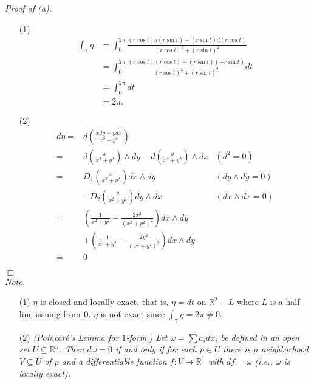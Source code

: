 \documentclass{article}
\begin{document}
\emph{Proof of (a).}
\begin{enumerate}
\item[(1)]
  \begin{align*}
    \int_{\gamma} \eta
    &= \int_{0}^{2\pi}
      \frac{(r\cos t) d(r\sin t) - (r\sin t) d(r\cos t)}{(r\cos t)^2 + (r\sin t)^2} \\
    &= \int_{0}^{2\pi}
      \frac{(r \cos t)(r \cos t) - (r\sin t) (-r\sin t)}{(r\cos t)^2 + (r\sin t)^2} dt \\
    &= \int_{0}^{2\pi} dt \\
    &= 2\pi.
  \end{align*}

\item[(2)]
  \begin{align*}
    d \eta
    =& d \left( \frac{x dy - y dx}{x^2+y^2} \right) \\
    =& d \left( \frac{x}{x^2+y^2} \right) \wedge dy
      - d \left( \frac{y}{x^2+y^2} \right) \wedge dx
      &(d^2 = 0) \\
    =& D_1\left(\frac{x}{x^2+y^2}\right) dx \wedge dy
      &(dy \wedge dy = 0) \\
      &- D_2\left(\frac{y}{x^2+y^2}\right) dy \wedge dx
      &(dx \wedge dx = 0) \\
    =& \left(\frac{1}{x^2+y^2} - \frac{2x^2}{(x^2+y^2)^2}\right) dx \wedge dy \\
      &+ \left(\frac{1}{x^2+y^2} - \frac{2y^2}{(x^2+y^2)^2}\right) dx \wedge dy \\
    =& 0
  \end{align*}
\end{enumerate}
$\Box$ \\



\emph{Note.}
\begin{enumerate}
\item[(1)]
  $\eta$ is closed and locally exact, that is,
  $\eta = dt$ on $\mathbb{R}^2 - L$
  where $L$ is a half-line issuing from $\mathbf{0}$.
  $\eta$ is not exact since $\int_{\gamma} \eta = 2\pi \neq 0$.

\item[(2)]
  \emph{(Poincar\'e's Lemma for $1$-form.)
  Let $\omega = \sum a_i dx_i$ be defined in an open set $U \subseteq \mathbb{R}^n$.
  Then $d\omega = 0$ if and only if for each $p \in U$ there is a neighborhood $V \subseteq U$
  of $p$ and a differentiable function $f: V \to \mathbb{R}^1$ with
  $df = \omega$ (i.e., $\omega$ is locally exact).} \\
\end{enumerate}
\end{document}
